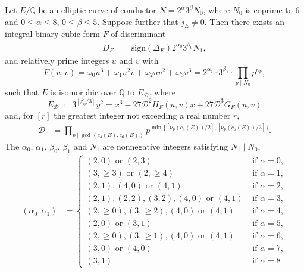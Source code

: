 \begin{theorem} \label{fisk}
Let $E/\mathbb{Q}$ be an elliptic curve of conductor $N=2^\alpha 3^\beta N_0$, where $N_0$ is coprime to $6$ and $0 \leq \alpha \leq 8$, $0 \leq \beta \leq 5$. Suppose further that $j_E \neq 0$.
Then there exists an integral binary cubic form $F$ of discriminant 
\begin{align*}
D_F &= \text{sign}(\Delta_E) 2^{\alpha_0} 3^{\beta_0} N_1,
\end{align*}
and relatively prime integers $u$ and $v$ with 
\begin{equation} \label{TM-eq}
F(u,v) =  \omega_0 u^3 + \omega_1 u^2v + \omega_2 uv^2 + \omega_3 v^3 = 2^{\alpha_1} \cdot 3^{\beta_1} \cdot \prod_{p \mid N_0} p^{\kappa_p},
\end{equation}
such that $E$ is isomorphic over $\mathbb{Q}$ to $E_{\mathcal{D} }$, where
\begin{equation} \label{curvey}
E_{\mathcal{D}} \; \; : \; \;  3^{[\beta_0/3]} y^2 = x^3 -27 \mathcal{D}^2 H_F(u,v) x +27 \mathcal{D}^3 G_F(u,v)
\end{equation}
and, for $[r]$ the greatest integer not exceeding a real number $r$,
\begin{align} \label{Dee}
\mathcal{D} &= \prod_{p \mid \gcd (c_4(E), c_6(E))} p^{\min \{ [\nu_p (c_4(E))/2], [\nu_p (c_6(E))/3] \}}.
\end{align}
The $\alpha_0$, $\alpha_1$, $\beta_0$, $\beta_1$ and $N_1$ are nonnegative integers satisfying  $N_1 \mid N_0$, 
\begin{align*}
(\alpha_0, \alpha_1) &=
\begin{cases}
(2, 0)  \mbox{ or } (2,3)  
    & \mbox{ if }  \alpha =0, \\
(3,\geq 3) \mbox{ or } (2,\geq 4)  
    & \mbox{ if }  \alpha =1, \\
(2,1), (4,0) \mbox{ or }  (4,1)  
    & \mbox{ if }  \alpha =2, \\
(2,1), (2,2), (3,2), (4,0)  \mbox{ or }  (4,1)  
    & \mbox{ if }  \alpha =3, \\
(2, \geq 0), (3, \geq 2), (4,0)  \mbox{ or }  (4, 1) 
    & \mbox{ if }  \alpha =4,  \\
(2, 0) \mbox{ or } (3,1) 
    & \mbox{ if }  \alpha =5, \\
(2, \geq 0), (3, \geq 1), (4,0) \mbox{ or }  (4, 1) 
    & \mbox{ if }  \alpha =6, \\
(3,0) \mbox{ or } (4,0) 
    & \mbox{ if }  \alpha =7,  \\
(3, 1) 
    & \mbox{ if }  \alpha =8
\end{cases}

\end{align*}
\end{theorem}
